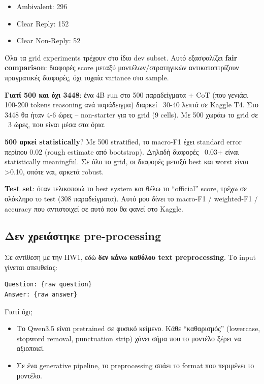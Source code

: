 \documentclass[12pt]{fphw}
\begin{document}
\begin{itemize}
    \item Ambivalent: 296
    \item Clear Reply: 152
    \item Clear Non-Reply: 52
\end{itemize}

Όλα τα grid experiments τρέχουν στο ίδιο dev subset. Αυτό εξασφαλίζει \textbf{fair comparison}: διαφορές score μεταξύ μοντέλων/στρατηγικών αντικατοπτρίζουν πραγματικές διαφορές, όχι τυχαία variance στο sample.

\textbf{Γιατί 500 και όχι 3448}: ένα 4B run στο 500 παραδείγματα + CoT (που γενιάει 100-200 tokens reasoning ανά παράδειγμα) διαρκεί ~30-40 λεπτά σε Kaggle T4. Στο 3448 θα ήταν 4-6 ώρες -- non-starter για το grid (9 cells). Με 500 χωράω το grid σε ~3 ώρες, που είναι μέσα στα όρια.

\textbf{500 αρκεί statistically}? Με 500 stratified, το macro-F1 έχει standard error περίπου 0.02 (rough estimate από bootstrap). Δηλαδή διαφορές ~0.03+ είναι statistically meaningful. Σε όλο το grid, οι διαφορές μεταξύ best και worst είναι >0.10, οπότε ναι, αρκετά robust.

\textbf{Test set}: όταν τελικοποιώ το best system και θέλω το ``official'' score, τρέχω σε ολόκληρο το test (308 παραδείγματα). Αυτό μου δίνει το macro-F1 / weighted-F1 / accuracy που αντιστοιχεί σε αυτό που θα φανεί στο Kaggle.

\subsection{Δεν χρειάστηκε pre-processing}

Σε αντίθεση με την HW1, εδώ \textbf{δεν κάνω καθόλου text preprocessing}. Το input γίνεται απευθείας:

\begin{verbatim}
Question: {raw question}
Answer: {raw answer}
\end{verbatim}

Γιατί όχι;

\begin{itemize}
    \item Το Qwen3.5 είναι pretrained σε φυσικό κείμενο. Κάθε ``καθαρισμός'' (lowercase, stopword removal, punctuation strip) χάνει σήμα που το μοντέλο ξέρει να αξιοποιεί.
    \item Σε ένα generative pipeline, το preprocessing σπάει το format που περιμένει το μοντέλο.
\end{itemize}
\end{document}
